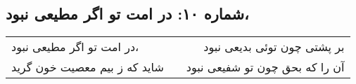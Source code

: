 \begin{center}
\section*{شماره ۱۰: در امت تو اگر مطیعی نبود،}
\label{sec:010}
\begin{longtable}{l p{0.5cm} r}
در امت تو اگر مطیعی نبود،
&&
بر پشتی چون توئی بدیعی نبود
\\
شاید که ز بیم معصیت خون گرید
&&
آن را که بحق چون تو شفیعی نبود
\\
\end{longtable}
\end{center}
